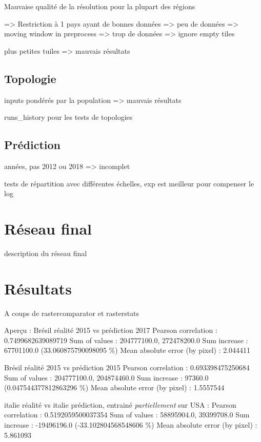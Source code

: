 \documentclass[a4paper, 11pt]{report}
\begin{document}
Mauvaise qualité de la résolution pour la plupart des régions

=> Restriction à 1 pays ayant de bonnes données => peu de données => moving window in preprocess => trop de données => ignore empty tiles

plus petites tuiles => mauvais résultats

\subsection{Topologie}

inputs pondérés par la population => mauvais résultats

runs\_history pour les tests de topologies

\subsection{Prédiction}

années, pas 2012 ou 2018 => incomplet

tests de répartition avec différentes échelles, exp est meilleur pour compenser le log

\section{Réseau final}

description du réseau final

\section{Résultats}

A coups de rastercomparator et rasterstats

Aperçu :
Brésil réalité 2015 vs prédiction 2017
Pearson correlation : 0.7499682639089719
Sum of values : 204777100.0, 272478200.0
Sum increase : 67701100.0 (33.060875790098095 \%)
Mean absolute error (by pixel) : 2.044411

Brésil réalité 2015 vs prédiction 2015
Pearson correlation : 0.693398475250684
Sum of values : 204777100.0, 204874460.0
Sum increase : 97360.0 (0.047544377812863296 \%)
Mean absolute error (by pixel) : 1.5557544

italie réalité vs italie prédiction, entrainé \textit{partiellement} sur USA :
Pearson correlation : 0.5192059500037354
Sum of values : 58895904.0, 39399708.0
Sum increase : -19496196.0 (-33.102804568548606 \%)
Mean absolute error (by pixel) : 5.861093
\end{document}
